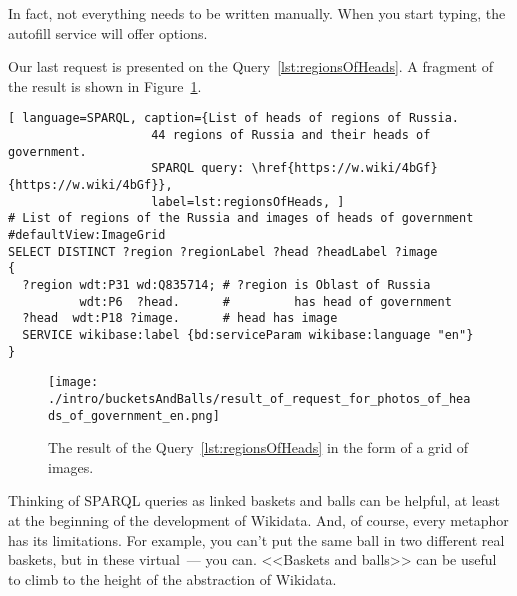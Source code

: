 In fact, not everything needs to be written manually. When you start typing, the autofill service will offer options.

Our last request is presented on the Query~\ref{lst:regionsOfHeads}. A fragment of the result is shown in Figure~\ref{fig:Result_of_the_request}.

\begin{lstlisting}[ language=SPARQL, caption={List of heads of regions of Russia. 
                    44 regions of Russia and their heads of government. 
                    SPARQL query: \href{https://w.wiki/4bGf}{https://w.wiki/4bGf}},
                    label=lst:regionsOfHeads, ]
# List of regions of the Russia and images of heads of government
#defaultView:ImageGrid
SELECT DISTINCT ?region ?regionLabel ?head ?headLabel ?image
{
  ?region wdt:P31 wd:Q835714; # ?region is Oblast of Russia
          wdt:P6  ?head.      #         has head of government
  ?head  wdt:P18 ?image.      # head has image
  SERVICE wikibase:label {bd:serviceParam wikibase:language "en"} 
}
\end{lstlisting}

\begin{figure}[h!]
\texttt{[image: ./intro/bucketsAndBalls/result\_of\_request\_for\_photos\_of\_heads\_of\_government\_en.png]}
\caption{The result of the Query~\ref{lst:regionsOfHeads} in the form of a grid of images.}
\label{fig:Result_of_the_request}
\end{figure}

Thinking of SPARQL queries as linked baskets and balls can be helpful, at least at the beginning of the development of Wikidata. And, of course, every metaphor has its limitations. For example, you can't put the same ball in two different real baskets, but in these virtual~--- you can. <<Baskets and balls>> can be useful to climb to the height of the abstraction of Wikidata.
